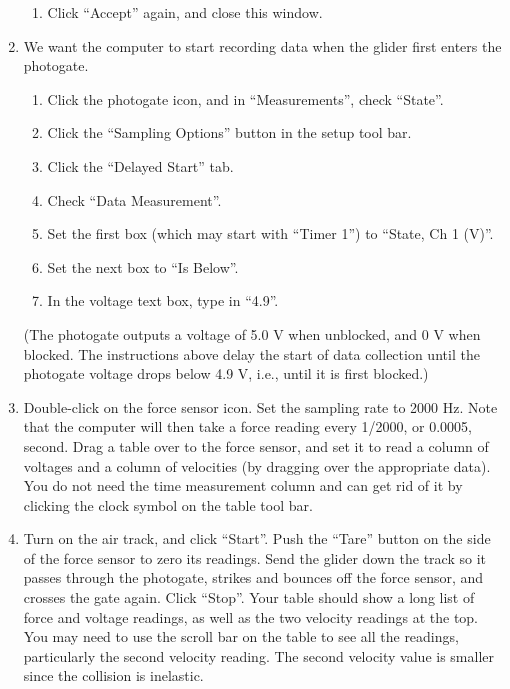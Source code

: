 \begin{enumerate}[label=\arabic*.]
\begin{enumerate}[label=\alph*.]
\item Click ``Accept'' again, and close this window.
\end{enumerate}

\item We want the computer to start recording data when the glider first enters the photogate.
\begin{enumerate}[label=\alph*.]
\item Click the photogate icon, and in ``Measurements'', check ``State''.
\item Click the ``Sampling Options'' button in the setup tool bar.
\item Click the ``Delayed Start'' tab.
\item Check ``Data Measurement''.
\item Set the first box (which may start with ``Timer 1'') to ``State, Ch 1 (V)''.
\item Set the next box to ``Is Below''.
\item In the voltage text box, type in ``4.9''.
\end{enumerate}
(The photogate outputs a voltage of 5.0 V when unblocked, and 0 V when blocked.  The instructions above delay the start of data collection until the photogate voltage drops below 4.9 V, i.e., until it is first blocked.)

\item Double-click on the force sensor icon.  Set the sampling rate to 2000 Hz.  Note that the computer will then take a force reading every 1/2000, or 0.0005, second.  Drag a table over to the force sensor, and set it to read a column of voltages and a column of velocities (by dragging over the appropriate data).  You do not need the time measurement column and can get rid of it by clicking the clock symbol on the table tool bar.

\item Turn on the air track, and click ``Start''. Push the ``Tare'' button on the side of the force sensor to zero its readings.  Send the glider down the track so it passes through the photogate, strikes and bounces off the force sensor, and crosses the gate again.  Click ``Stop''.  Your table should show a long list of force and voltage readings, as well as the two velocity readings at the top.  You may need to use the scroll bar on the table to see all the readings, particularly the second velocity reading.  The second velocity value is smaller since the collision is inelastic.


\end{enumerate}
